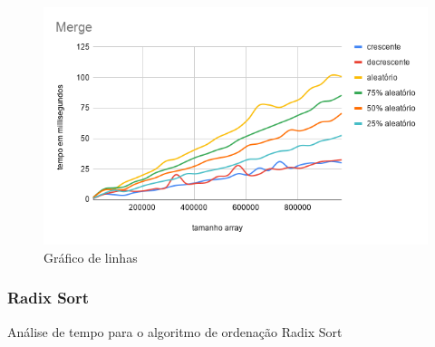 \documentclass[a4paper, 12pt]{article}
\begin{document}
	\begin{figure}[!h]
		\caption{ Gráfico de linhas }
		\label{fig:merge2}
		\centering
			\includegraphics[width=1\textwidth, height=0.57\textwidth]{Merge _linha}
	\end{figure}


	\newpage
\subsubsection{Radix Sort}
Análise de tempo para o algoritmo de ordenação Radix Sort
\end{document}
